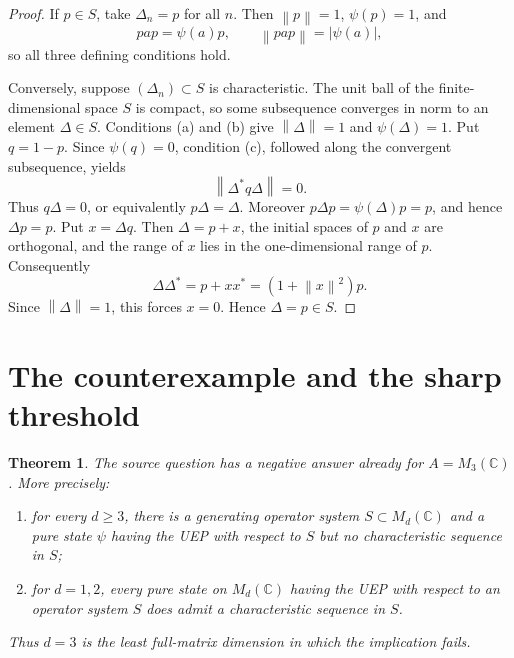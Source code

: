 \documentclass[11pt]{article}
\newtheorem{theorem}{Theorem}
\theoremstyle{remark}
\newcommand{\Md}{M_d(\mathbb C)}
\newcommand{\norm}[1]{\left\lVert#1\right\rVert}
\begin{document}
\begin{proof}
If $p\in S$, take $\Delta_n=p$ for all $n$.  Then $\norm p=1$,
$\psi(p)=1$, and
\[
 p a p=\psi(a)p,
 \qquad \norm{pap}=|\psi(a)|,
\]
so all three defining conditions hold.

Conversely, suppose $(\Delta_n)\subset S$ is characteristic.  The unit ball
of the finite-dimensional space $S$ is compact, so some subsequence converges
in norm to an element $\Delta\in S$.  Conditions (a) and (b) give
$\norm\Delta=1$ and $\psi(\Delta)=1$.  Put $q=1-p$.  Since $\psi(q)=0$,
condition (c), followed along the convergent subsequence, yields
\[
 \norm{\Delta^*q\Delta}=0.
\]
Thus $q\Delta=0$, or equivalently $p\Delta=\Delta$.  Moreover
$p\Delta p=\psi(\Delta)p=p$, and hence $\Delta p=p$.  Put
$x=\Delta q$.  Then $\Delta=p+x$, the initial spaces of $p$ and $x$ are
orthogonal, and the range of $x$ lies in the one-dimensional range of $p$.
Consequently
\[
 \Delta\Delta^*=p+xx^*=(1+\norm{x}^2)p.
\]
Since $\norm\Delta=1$, this forces $x=0$.  Hence $\Delta=p\in S$.
\end{proof}

\section{The counterexample and the sharp threshold}

\begin{theorem}\label{thm:main}
The source question has a negative answer already for $A=M_3(\mathbb C)$.
More precisely:
\begin{enumerate}[label=(\roman*)]
\item for every $d\geq3$, there is a generating operator system
$S\subset\Md$ and a pure state $\psi$ having the UEP with respect to $S$ but
no characteristic sequence in $S$;
\item for $d=1,2$, every pure state on $\Md$ having the UEP with respect to
an operator system $S$ does admit a characteristic sequence in $S$.
\end{enumerate}
Thus $d=3$ is the least full-matrix dimension in which the implication fails.
\end{theorem}
\end{document}
